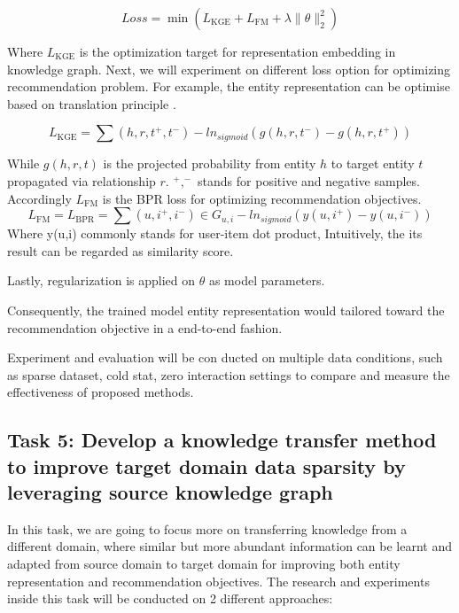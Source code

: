 \begin{equation}
    Loss=\min{(L_\text{KGE}+L_\text{FM}+\lambda\|\theta\|^2_2)}
\end{equation}

Where $L_\text{KGE}$ is the optimization target for representation embedding in knowledge graph. Next, we will experiment on different loss option for optimizing recommendation problem. For example, the entity representation can be optimise based on translation principle \citep{lin2017learning}.

\begin{equation}
    L_\text{KGE}=\sum{(h,r,t^+,t^-)} -ln_{sigmoid}(g(h,r,t^-)-g(h,r,t^+))
\end{equation}

While $g(h,r,t)$ is the projected probability from entity $h$ to target entity $t$ propagated via relationship $r$. $^+,^-$ stands for positive and negative samples. Accordingly $L_\text{FM}$ is the BPR \citep{rendle2012bpr} loss for optimizing recommendation objectives.
\begin{equation}
    L_\text{FM} = L_\text{BPR}=\sum{(u,i^+,i^-) \in G_{u,i}} -ln_{sigmoid}(y(u,i^+)-y(u,i^-))
\end{equation}
Where y(u,i) commonly stands for user-item dot product, Intuitively, the its result can be regarded as similarity score.

Lastly, regularization is applied on $\theta$ as model parameters.

Consequently, the trained model entity representation would tailored toward the recommendation objective in a end-to-end fashion.

Experiment and evaluation will be con ducted on multiple data conditions, such as sparse dataset, cold stat, zero interaction settings to compare and measure the effectiveness of proposed methods.


\subsection*{Task 5: Develop a knowledge transfer method to improve target domain data sparsity by leveraging source knowledge graph}

In this task, we are going to focus more on transferring knowledge from a different domain, where similar but more abundant information can be learnt and adapted from source domain to target domain for improving both entity representation and recommendation objectives. The research and experiments inside this task will be conducted on 2 different approaches:

